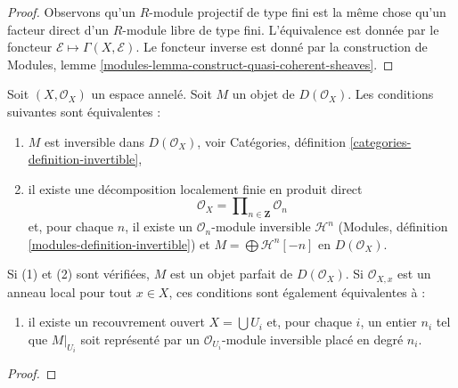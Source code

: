 {\begin{proof}
Observons qu'un $R$-module projectif de type fini est la même chose qu'un facteur direct d'un $R$-module libre de type fini. L'équivalence est donnée par le foncteur $\mathcal{E} \mapsto
\Gamma(X, \mathcal{E})$. Le foncteur inverse est donné par la construction de Modules, lemme \ref{modules-lemma-construct-quasi-coherent-sheaves}.
\end{proof}

\begin{lemma}

\label{lemma-invertible-derived}

Soit $(X, \mathcal{O}_X)$ un espace annelé. Soit $M$ un objet de $D(\mathcal{O}_X)$. Les conditions suivantes sont équivalentes :

\begin{enumerate}

\item  $M$ est inversible dans $D(\mathcal{O}_X)$, voir Catégories, définition \ref{categories-definition-invertible},
\item il existe une décomposition localement finie en produit direct
$$
\mathcal{O}_X = \prod\nolimits_{n \in \mathbf{Z}} \mathcal{O}_n
$$
et, pour chaque $n$, il existe un $\mathcal{O}_n$-module inversible
$\mathcal{H}^n$ (Modules, définition \ref{modules-definition-invertible}) et $M = \bigoplus \mathcal{H}^n[-n]$ en $D(\mathcal{O}_X)$.

\end{enumerate}

Si (1) et (2) sont vérifiées, $M$ est un objet parfait de $D(\mathcal{O}_X)$. Si
$\mathcal{O}_{X, x}$ est un anneau local pour tout $x \in X$, ces conditions sont également équivalentes à :

\begin{enumerate}

\item[(3)] il existe un recouvrement ouvert $X = \bigcup U_i$
et, pour chaque $i$, un entier $n_i$ tel que $M|_{U_i}$
soit représenté par un $\mathcal{O}_{U_i}$-module inversible placé en degré $n_i$.

\end{enumerate}

\end{lemma}

\begin{proof}


\end{proof}}
